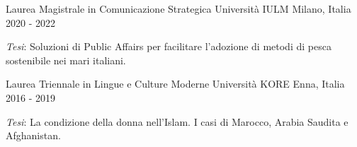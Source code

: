 
\begin{cventries}

\cventry
{Laurea Magistrale in Comunicazione Strategica} %
{Università IULM} %
{Milano, Italia} %
{2020 - 2022} %
{
\begin{cvitems} %
\item \textit{Tesi}: Soluzioni di Public Affairs per facilitare l'adozione di metodi di pesca sostenibile nei mari italiani.
\end{cvitems}
}

\cventry
{Laurea Triennale in Lingue e Culture Moderne} %
{Università KORE} %
{Enna, Italia} %
{2016 - 2019} %
{
\begin{cvitems} %
\item \textit{Tesi}: La condizione della donna nell'Islam. I casi di Marocco, Arabia Saudita e Afghanistan.
\end{cvitems}
}



\end{cventries}
